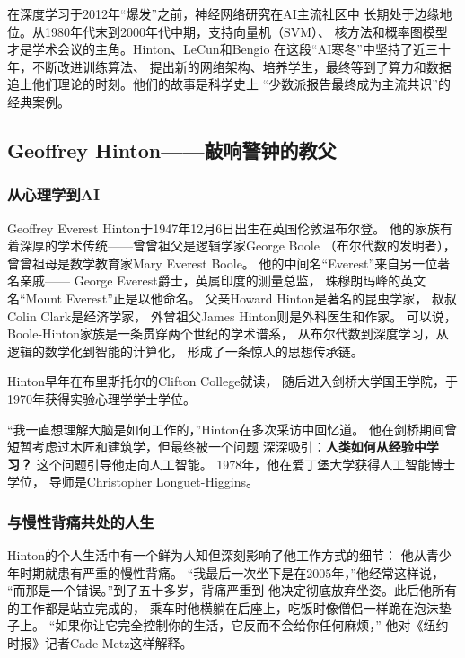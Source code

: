 \begin{whybox}
在深度学习于2012年``爆发''之前，神经网络研究在AI主流社区中
长期处于边缘地位。从1980年代末到2000年代中期，支持向量机（SVM）、
核方法和概率图模型才是学术会议的主角。Hinton、LeCun和Bengio
在这段``AI寒冬''中坚持了近三十年，不断改进训练算法、
提出新的网络架构、培养学生，最终等到了算力和数据
追上他们理论的时刻。他们的故事是科学史上
``少数派报告最终成为主流共识''的经典案例。
\end{whybox}


\subsection{Geoffrey Hinton——敲响警钟的教父}
\label{sec:hinton}

\subsubsection{从心理学到AI}
Geoffrey Everest Hinton于1947年12月6日出生在英国伦敦温布尔登。
他的家族有着深厚的学术传统——曾曾祖父是逻辑学家George Boole
（布尔代数的发明者），曾曾祖母是数学教育家Mary Everest Boole。
他的中间名``Everest''来自另一位著名亲戚——
George Everest爵士，英属印度的测量总监，
珠穆朗玛峰的英文名``Mount Everest''正是以他命名。
父亲Howard Hinton是著名的昆虫学家，
叔叔Colin Clark是经济学家，
外曾祖父James Hinton则是外科医生和作家。
可以说，Boole-Hinton家族是一条贯穿两个世纪的学术谱系，
从布尔代数到深度学习，从逻辑的数学化到智能的计算化，
形成了一条惊人的思想传承链。

Hinton早年在布里斯托尔的Clifton College就读，
随后进入剑桥大学国王学院，于1970年获得实验心理学学士学位。

``我一直想理解大脑是如何工作的，''Hinton在多次采访中回忆道。
他在剑桥期间曾短暂考虑过木匠和建筑学，但最终被一个问题
深深吸引：\textbf{人类如何从经验中学习？}
这个问题引导他走向人工智能。
1978年，他在爱丁堡大学获得人工智能博士学位，
导师是Christopher Longuet-Higgins。

\subsubsection{与慢性背痛共处的人生}
Hinton的个人生活中有一个鲜为人知但深刻影响了他工作方式的细节：
他从青少年时期就患有严重的慢性背痛。
``我最后一次坐下是在2005年，''他经常这样说，
``而那是一个错误。''到了五十多岁，背痛严重到
他决定彻底放弃坐姿。此后他所有的工作都是站立完成的，
乘车时他横躺在后座上，吃饭时像僧侣一样跪在泡沫垫子上。
``如果你让它完全控制你的生活，它反而不会给你任何麻烦，''
他对《纽约时报》记者Cade Metz这样解释。

